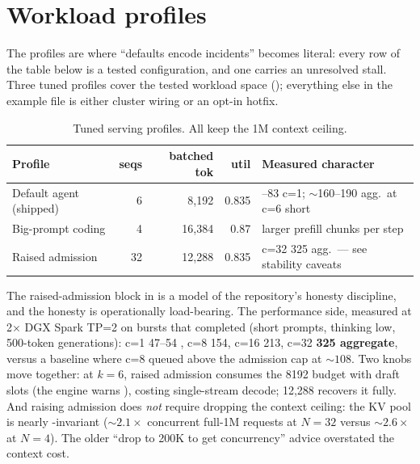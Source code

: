 \section{Workload profiles}
\label{sec:profile-workloads}

The profiles are where ``defaults encode incidents'' becomes literal: every
row of the table below is a tested configuration, and one carries an
unresolved stall. Three tuned profiles cover the tested workload space
(); everything else in the example file is either
cluster wiring or an opt-in hotfix.

\begin{table}[htbp]
\centering\footnotesize
\caption{Tuned serving profiles. All keep the 1M context ceiling.}
\label{tab:profile-workloads}
\footnotesize
\begin{tabular}{@{}lrrr>{\raggedright\arraybackslash}p{4.6cm}@{}}
\toprule
Profile & seqs & batched tok & util & Measured character \\
\midrule
Default agent (shipped) & 6 & 8{,}192 & 0.835 & 62--83 \tokspersec{} c=1; ${\sim}$160--190 agg.\ at c=6 short \\
Big-prompt coding & 4 & 16{,}384 & 0.87 & larger prefill chunks per step \\
Raised admission & 32 & 12{,}288 & 0.835 & c=32 325 agg.\ --- see stability caveats \\
\bottomrule
\end{tabular}
\end{table}

The raised-admission block in  is a model of
the repository's honesty discipline, and the honesty is operationally load-bearing.
The performance side, measured at 2$\times$ DGX Spark TP=2 on bursts that
completed (short prompts, thinking low, 500-token generations):
c=1 47--54 \tokspersec{}, c=8 154, c=16 213, c=32 \textbf{325 aggregate}, versus a
baseline where c=8 queued above the admission cap at ${\sim}108$. Two knobs
move together: at $k{=}6$, raised admission consumes the 8192 budget with
draft slots (the engine warns ),
costing single-stream decode; 12{,}288 recovers it fully. And raising
admission does \emph{not} require dropping the context ceiling: the KV pool is
nearly -invariant (${\sim}2.1\times$ concurrent full-1M
requests at $N{=}32$ versus ${\sim}2.6\times$ at $N{=}4$). The older
``drop to 200K to get concurrency'' advice overstated the context cost.


